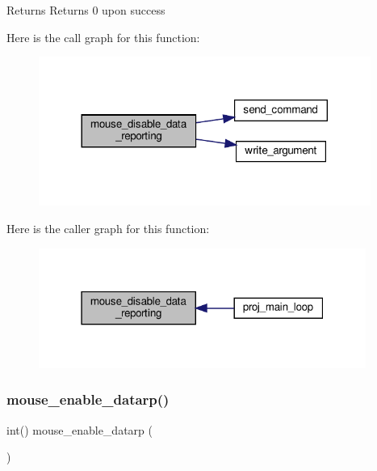 \begin{DoxyReturn}{Returns}
Returns 0 upon success 
\end{DoxyReturn}
Here is the call graph for this function\+:
\nopagebreak
\begin{figure}[H]
\begin{center}
\leavevmode
\includegraphics[width=308pt]{group__mouse_ga7e311379d4d64f88873ef8ade5c82a25_cgraph}
\end{center}
\end{figure}
Here is the caller graph for this function\+:\nopagebreak
\begin{figure}[H]
\begin{center}
\leavevmode
\includegraphics[width=304pt]{group__mouse_ga7e311379d4d64f88873ef8ade5c82a25_icgraph}
\end{center}
\end{figure}
\mbox{\label{group__mouse_ga90562ec8e969e4014d728adb0fc91e31}} 
\subsubsection{\texorpdfstring{mouse\+\_\+enable\+\_\+datarp()}{mouse\_enable\_datarp()}}
{\footnotesize\ttfamily int() mouse\+\_\+enable\+\_\+datarp (\begin{DoxyParamCaption}{ }\end{DoxyParamCaption})}




